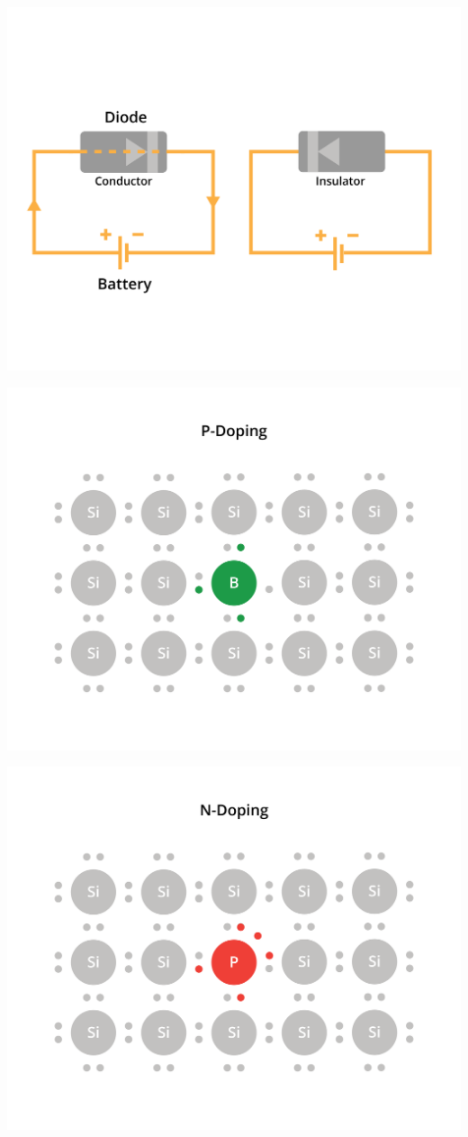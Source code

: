 \includegraphics[width=.75\textwidth]{diodeIntroAlt.png}


\includegraphics[width=.75\textwidth]{doping-26.png}

\includegraphics[width=.75\textwidth]{doping-27.png}

